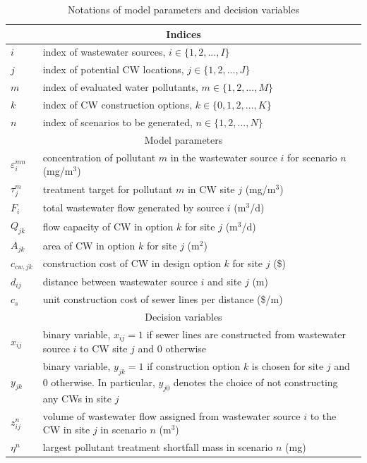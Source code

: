 \documentclass[preprint,12pt,authoryear]{elsarticle}
\begin{document}
\begin{table}[!htpb]
	\setlength{\extrarowheight}{1.5mm}
	\caption{Notations of model parameters and decision variables}
	\begin{tabular}{|p{1.5cm} p{16cm}|}
		\hline
		\multicolumn{2}{|c|}{Indices} \\
		\hline
		$i$ & index of wastewater sources, $i\in\{1,2,...,I\}$\\
		$j$ & index of potential CW locations, $j\in\{1,2,...,J\}$ \\
		$m$ & index of evaluated water pollutants, $m\in\{1,2,...,M\}$\\
		$k$ & index of CW construction options, $k\in\{0,1,2,...,K\}$\\
		$n$ & index of scenarios to be generated, $n\in\{1,2,...,N\}$\\
		\hline
		\multicolumn{2}{|c|}{Model parameters} \\
		\hline
		$\varepsilon_i^{mn}$ & concentration of pollutant $m$ in the wastewater source $i$ for scenario $n$ (mg/m$^3$)\\
		$\tau_{j}^m$ & treatment target for pollutant $m$ in CW site $j$ (mg/m$^3$)\\
		$F_{i}$ & total wastewater flow generated by source $i$ (m$^3$/d)\\
		$Q_{jk}$ &  flow capacity of CW in option $k$ for site $j$ (m$^3$/d)\\
		$A_{jk}$ & area of CW in option $k$ for site $j$ (m$^2$)\\		
		$c_{cw,jk}$ & construction cost of CW in design option $k$ for site $j$ (\$) \\	
		$d_{ij}$ & distance between wastewater source $i$ and site $j$ (m)\\
		$c_s$ & unit construction cost of sewer lines per distance (\$/m)\\
		\hline
		\multicolumn{2}{|c|}{Decision variables}\\
		\hline	
		$x_{ij}$ & binary variable, $x_{ij}=1$ if sewer lines are constructed from wastewater source $i$ to CW site $j$ and $0$ otherwise\\
		$y_{jk}$ & binary variable, $y_{jk}=1$ if construction option $k$ is chosen for site $j$ and $0$ otherwise. In particular, $y_{j0}$ denotes the choice of not constructing any CWs in site $j$\\
		$z_{ij}^n$ & volume of wastewater flow assigned from wastewater source $i$ to the CW in site $j$ in scenario $n$  (m$^3$)\\
		$\eta^n$ & largest pollutant treatment shortfall mass in scenario $n$ (mg)\\
		\hline	
	\end{tabular}

	\label{table:modelparameters2}
\end{table}
\end{document}
